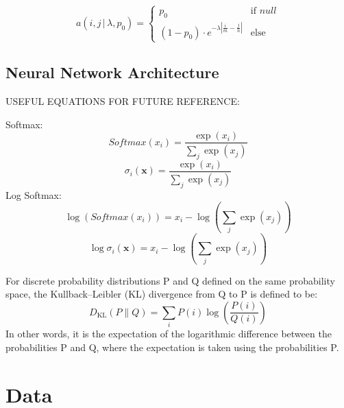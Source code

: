 \documentclass[twoside,twocolumn]{article}
\renewcommand{\vec}[1]{\mathbf{#1}}
\begin{document}
\begin{equation}
a(i, j \, | \, \lambda, p_0) =
\begin{cases} 
      p_0 & \text{if } null \\
     (1-p_0) \cdot e^{-\lambda | \frac{i}{m} - \frac{j}{n}|} & \text{else}
   \end{cases}
\end{equation}

\subsection{Neural Network Architecture}

USEFUL EQUATIONS FOR FUTURE REFERENCE:

Softmax:
\begin{equation}
Softmax(x_i) = \frac{\exp(x_i)}{\sum_j\exp(x_j)}
\end{equation}
\begin{equation}
\sigma_i(\vec{x}) = \frac{\exp(x_i)}{\sum_j\exp(x_j)}
\end{equation}
Log Softmax: %
\begin{equation}
\log \left( Softmax(x_i) \right) = x_i - \log \left( \sum_j\exp(x_j) \right)
\end{equation}
\begin{equation}
\log  \sigma_i(\vec{x})  = x_i - \log \left( \sum_j\exp(x_j) \right)
\end{equation}

For discrete probability distributions P and Q defined on the same probability space, the Kullback–Leibler (KL) divergence from Q to P is defined to be:
\begin{equation}
D _ { \mathrm { KL } } ( P \| Q ) = \sum _ { i } P ( i ) \log \left( \frac { P ( i ) } { Q ( i ) } \right)
\end{equation}
In other words, it is the expectation of the logarithmic difference between the probabilities P and Q, where the expectation is taken using the probabilities P. 

\section{Data}
\end{document}
